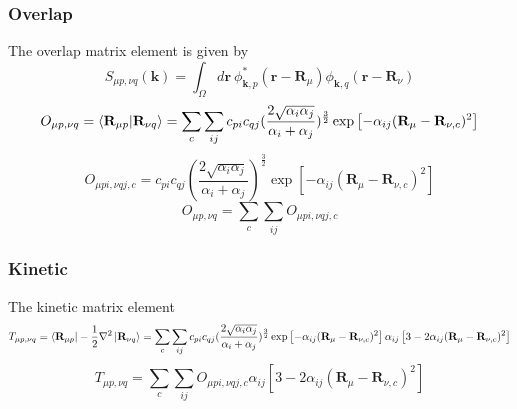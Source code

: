 \documentclass{article}
\begin{document}
        \subsubsection{Overlap}
            The overlap matrix element is given by
            \begin{equation}
                S_{\mu p,\nu q}(\textbf{k}) = \int_{\Omega}d\textbf{r}\ \phi_{\textbf{k},p}^*(\textbf{r}-\textbf{R}_{\mu})\phi_{\textbf{k},q}(\textbf{r}-\textbf{R}_{\nu})
            \end{equation}
            \begin{equation}
                O_{\mu p,\nu q} = \braket{\textbf{R}_{\mu p}|\textbf{R}_{\nu q}} 
                = \sum_c\sum_{ij}c_{pi}c_{qj}(\frac{2\sqrt{\alpha_i\alpha_j}}{\alpha_i+\alpha_j})^{\frac{3}{2}}
                \exp\left[-\alpha_{ij}(\textbf{R}_{\mu}-\textbf{R}_{\nu,c})^2\right]
            \end{equation}
            \begin{equation}
                O_{\mu pi,\nu qj,c} = c_{pi}c_{qj}(\frac{2\sqrt{\alpha_i\alpha_j}}{\alpha_i+\alpha_j})^{\frac{3}{2}}
                \exp\left[-\alpha_{ij}(\textbf{R}_{\mu}-\textbf{R}_{\nu,c})^2\right]
            \end{equation}
            \begin{equation}
                O_{\mu p,\nu q} = \sum_c\sum_{ij}O_{\mu pi,\nu qj,c}
            \end{equation}

        \subsubsection{Kinetic}
            The kinetic matrix element
            \begin{equation}
                T_{\mu p,\nu q} = \bra{\textbf{R}_{\mu p}}-\frac{1}{2}\nabla^2\ket{\textbf{R}_{\nu q}}
                = \sum_c\sum_{ij}c_{pi}c_{qj}(\frac{2\sqrt{\alpha_i\alpha_j}}{\alpha_i+\alpha_j})^{\frac{3}{2}}
                \exp\left[-\alpha_{ij}(\textbf{R}_{\mu}-\textbf{R}_{\nu,c})^2\right]
                \alpha_{ij}\left[3-2\alpha_{ij}(\textbf{R}_{\mu}-\textbf{R}_{\nu,c})^2\right]
            \end{equation}
            \begin{equation}
                T_{\mu p,\nu q} = \sum_c\sum_{ij}O_{\mu pi,\nu qj,c}
                \alpha_{ij}\left[3-2\alpha_{ij}(\textbf{R}_{\mu}-\textbf{R}_{\nu,c})^2\right]
            \end{equation}
\end{document}
